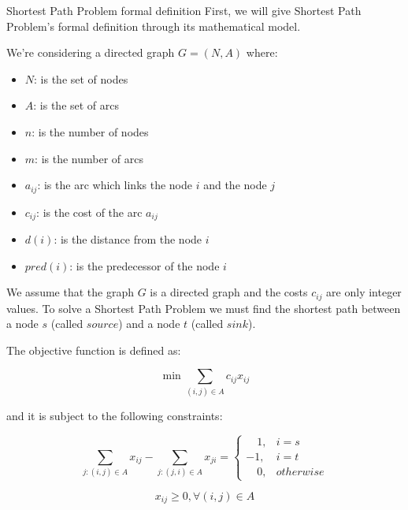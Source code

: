 \documentclass[9pt]{extarticle}
\begin{document}
    \begin{section}{Shortest Path Problem formal definition}
        First, we will give Shortest Path Problem's formal definition through its mathematical model.
        
        We're considering a directed graph $G=(N,A)$ where:
        
        \begin{itemize}
            \item $N$: is the set of nodes
            \item $A$: is the set of arcs
            \item $n$: is the number of nodes
            \item $m$: is the number of arcs
            \item $a_{ij}$: is the arc which links the node $i$ and the node $j$
            \item $c_{ij}$: is the cost of the arc $a_{ij}$
            \item $d(i)$: is the distance from the node $i$
            \item $pred(i)$: is the predecessor of the node $i$
        \end{itemize}

        We assume that the graph $G$ is a directed graph and the costs $c_{ij}$ are only integer values. 
        To solve a Shortest Path Problem we must find the shortest path between a node $s$ (called $source$) and a node 
        $t$ (called $sink$).

        The objective function is defined as:

        $$
            \min\sum_{(i,j) \in A} c_{ij}x_{ij}
        $$

        and it is subject to the following constraints:

        \begin{equation}
            \sum_{j:(i,j) \in A} x_{ij} - \sum_{j:(j,i) \in A} x_{ji} = 
            \begin{cases}
               \quad\! 1,  & i=s \\
               -1, & i=t \\
               \quad\! 0,  & otherwise 
            \end{cases} \label{eq:costraint1} \tag{1}  
        \end{equation}

        $$
            x_{ij} \geq 0, \forall (i,j) \in A
        $$

        \vspace{10px}


\end{section}
\end{document}
